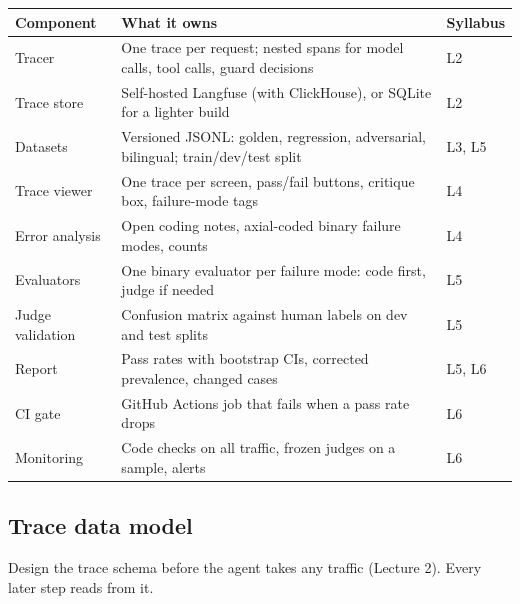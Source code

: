 \documentclass[11pt,a4paper]{article}
\begin{document}
\begin{center}
\small
\begin{tabularx}{\linewidth}{@{}l X l@{}}
\toprule
\textbf{Component} & \textbf{What it owns} & \textbf{Syllabus}\\
\midrule
Tracer & One trace per request; nested spans for model calls, tool calls, guard decisions & L2\\
Trace store & Self-hosted Langfuse (with ClickHouse), or SQLite for a lighter build & L2\\
Datasets & Versioned JSONL: golden, regression, adversarial, bilingual; train/dev/test split & L3, L5\\
Trace viewer & One trace per screen, pass/fail buttons, critique box, failure-mode tags & L4\\
Error analysis & Open coding notes, axial-coded binary failure modes, counts & L4\\
Evaluators & One binary evaluator per failure mode: code first, judge if needed & L5\\
Judge validation & Confusion matrix against human labels on dev and test splits & L5\\
Report & Pass rates with bootstrap CIs, corrected prevalence, changed cases & L5, L6\\
CI gate & GitHub Actions job that fails when a pass rate drops & L6\\
Monitoring & Code checks on all traffic, frozen judges on a sample, alerts & L6\\
\bottomrule
\end{tabularx}
\end{center}

\subsection{Trace data model}

Design the trace schema before the agent takes any traffic (Lecture 2). Every later step reads
from it.
\end{document}
